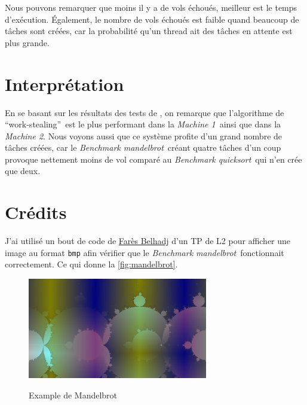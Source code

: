 \documentclass[a4paper]{article}
\def\mone{\textit{Machine 1}} %
\def\mtwo{\textit{Machine 2}} %
\def\bone{\textit{Benchmark quicksort}}
\def\btwo{\textit{Benchmark mandelbrot}}
\def\ws{\enquote{work-stealing}}
\newcommand{\docref}[1]{\textit{\nameref{#1}}} %
\begin{document}
Nous pouvons remarquer que moins il y a de vols échoués, meilleur est
le temps d'exécution. Également, le nombre de vols échoués est faible quand
beaucoup de tâches sont créées, car la probabilité qu'un thread ait des tâches
en attente est plus grande.


\section{Interprétation}
En se basant sur les résultats des tests de \docref{sec:stats}, on remarque
que l'algorithme de \ws~est le plus performant dans la \mone~ainsi que dans
la \mtwo. Nous voyons aussi que ce système profite d'un grand nombre de
tâches créées, car le \btwo~créant quatre tâches d'un coup provoque nettement
moins de vol comparé au \bone~qui n'en crée que deux.

\clearpage
\appendix
\section{Crédits}

J'ai utilisé un bout de code de \href{https://expreg.org/amsi/C/}{Farès Belhadj}
d'un TP de L2 pour afficher une image au format \texttt{bmp} afin vérifier que
le \btwo~fonctionnait correctement. Ce qui donne la \autoref{fig:mandelbrot}.

\begin{figure}[h!]
  \centering
  \includegraphics[alt={Fractale mandelbrot},width=0.7\textwidth]{imgs/mandelbrot.jpg}
  \caption{Example de Mandelbrot}
  \label{fig:mandelbrot}
\end{figure}
\end{document}
